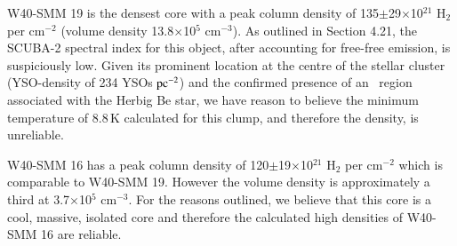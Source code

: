 W40-SMM 19 is the densest core with a peak column density of 135$\pm$29$\times$10$^{21}$ 
H$_{\mathrm{2}}$ per cm$^{-2}$ (volume density 13.8$\times$10$^{5}$ cm$^{-3}$). As outlined 
in Section 4.21, the SCUBA-2 spectral index for this object, after accounting for free-free 
emission, is suspiciously low. Given its prominent location at the centre of the stellar cluster 
(YSO-density of 234 YSOs$\hbox{ pc$^{-2}$}$) and the confirmed presence of an \UCHII\ region 
associated with the Herbig Be star, we have reason to believe the minimum temperature of 8.8\,K 
calculated for this clump, and therefore the density, is unreliable. 

W40-SMM 16 has a peak column density of 120$\pm$19$\times$10$^{21}$ H$_{\mathrm{2}}$ per 
cm$^{-2}$ which is comparable to W40-SMM 19. However the volume density is approximately a 
third at 3.7$\times$10$^{5}$ cm$^{-3}$. For the reasons outlined, we believe that this core is 
a cool, massive, isolated core and therefore the calculated high densities of W40-SMM 16 are reliable. 





